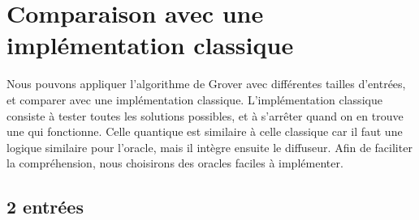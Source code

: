 \section{Comparaison avec une implémentation classique}\label{sec:comparaison-avec-une-implementation-classique}

Nous pouvons appliquer l'algorithme de Grover avec différentes tailles d'entrées, et comparer
avec une implémentation classique.
L'implémentation classique consiste à tester toutes les solutions possibles, et à s'arrêter
quand on en trouve une qui fonctionne.
Celle quantique est similaire à celle classique car il faut une logique similaire pour l'oracle,
mais il intègre ensuite le diffuseur.
Afin de faciliter la compréhension, nous choisirons des oracles faciles à implémenter.

\subsection{2 entrées}\label{subsec:2-entrees}

